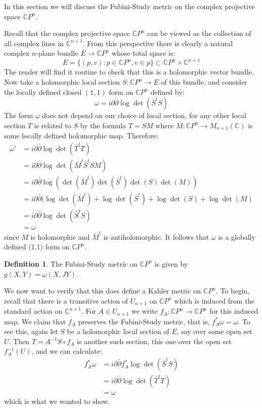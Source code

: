 \documentclass[11pt]{amsart}
\theoremstyle{definition}
\newtheorem{definition}[subsection]{Definition}
\def \CP{ \mathbb{C}P }
\def \C{ \mathbb{C} }
\def \del{ \partial }
\def \delbar{ \bar{\partial} }
\begin{document}
\parskip 6pt
\parindent 0pt
\baselineskip 14pt

In this section we will discuss the Fubini-Study metric on the complex projective space $\CP^n$.

Recall that the complex projective space $\CP^n$ can be viewed as the collection of all complex lines in $\C^{n+1}$.  From this perspective there is clearly a natural complex $n$-plane bundle $E \rightarrow \CP^n$ whose total space is:
%
$$ E = \{ (p,v) : p \in \CP^n, v \in p \} \subset \CP^n \times \C^{n+1} $$
%
The reader will find it routine to check that this is a holomorphic vector bundle.  Now take a holomorphic local section $S: \CP^n \rightarrow E$ of this bundle, and consider the locally defined closed $(1,1)$ form on $\CP^n$ defined by:
%
$$ \omega = i \del \delbar \log \det ( \bar{S}^{t} S ) $$
%
The form $\omega$ does not depend on our choice of local section, for any other local section $T$ is related to $S$ by the formula $T = S M$ where $M: \CP^n \rightarrow M_{n+1}( \C )$ is some locally defined holomorphic map.  Therefore:
%
\begin{align*} \omega' &= i \del \delbar \log \det ( \bar{T}^{t} T ) \\
&= i \del \delbar \log \det( \bar{M}^t \bar{S}^t S M ) \\
&= i \del \delbar \log ( \det( \bar{M}^t ) \det( \bar{S}^t ) \det( S ) \det ( M ) ) \\
&= i \del \delbar( \log \det(\bar{M}^t) + \log \det(\bar{S}^t) + \log \det(S) + \log \det(M) \\
&= i \del \delbar \log \det ( \bar{S}^{t} S ) \\
&= \omega
\end{align*}
%
since $M$ is holomorphic and $\bar{M}^t$ is antiholomorphic.  It follows that $\omega$ is a globally defined (1,1) form on $\CP^n$.
%
\begin{definition} The Fubini-Study metric on $\CP^n$ is given by $g(X,Y) = \omega(X,JY)$.
\end{definition}
%
We now want to verify that this does define a Kahler metric on $\CP^n$.  To begin, recall that there is a transitive action of $U_{n+1}$ on $\CP^n$ which is induced from the standard action on $\C^{n+1}$.  For $A \in U_{n+1}$ we write $f_{A}: \CP^n \rightarrow \CP^n$ for this induced map.  We claim that $f_A$ preserves the Fubini-Study metric, that is, $f^{\ast}_A \omega = \omega$.  To see this, again let $S$ be a holomorphic local section of $E$, say over some open set $U$.  Then $T = A^{-1}S \circ f_A$ is another such section, this one over the open set $f_A^{-1}(U)$, and we can calculate:
%
\begin{align*} f^{\ast}_A \omega &= i \del \delbar f^{\ast}_A \log \det ( \bar{S}^t S ) \\
&= i \del \delbar \log \det ( \bar{T}^t T ) \\
&= \omega 
\end{align*}
%
which is what we wanted to show.
\end{document}
